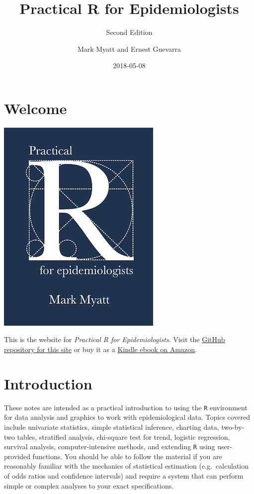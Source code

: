 \documentclass[12pt,a4paper]{book}
\title{Practical R for Epidemiologists}
\subtitle{Second Edition}
\author{Mark Myatt and Ernest Guevarra}
\date{2018-05-08}
\theoremstyle{definition}
\theoremstyle{definition}
\theoremstyle{definition}
\theoremstyle{remark}
\begin{document}
\maketitle

{
\hypersetup{linkcolor=black}
\setcounter{tocdepth}{1}
\tableofcontents
}
\hypertarget{welcome}{%
\chapter*{Welcome}\label{welcome}}

\includegraphics{images/bookcover_medium.jpg}

This is the website for \emph{Practical R for Epidemiologists}. Visit
the
\href{https://github.com/ernestguevarra/practical-r-for-epidemiologists}{GitHub
repository for this site} or buy it as a
\href{https://www.amazon.co.uk/Practical-R-Epidemiologists-Mark-Myatt-ebook/dp/B00DQATKIE/ref=sr_1_1?ie=UTF8\&qid=1524423427\&sr=8-1\&keywords=practical+r+for+epidemiologists}{Kindle
ebook on Amazon}.

\hypertarget{introduction}{%
\chapter*{Introduction}\label{introduction}}

These notes are intended as a practical introduction to using the
\texttt{R} environment for data analysis and graphics to work with
epidemiological data. Topics covered include univariate statistics,
simple statistical inference, charting data, two-by-two tables,
stratified analysis, chi-square test for trend, logistic regression,
survival analysis, computer-intensive methods, and extending \texttt{R}
using user-provided functions. You should be able to follow the material
if you are reasonably familiar with the mechanics of statistical
estimation (e.g.~calculation of odds ratios and confidence intervals)
and require a system that can perform simple or complex analyses to your
exact specifications.
\end{document}
